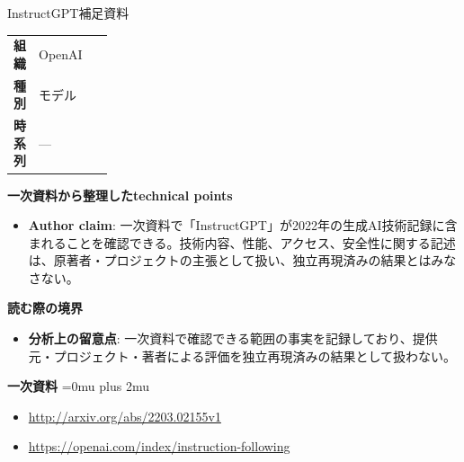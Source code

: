 \begin{technicalnote}{InstructGPT}{補足資料}
\begingroup
\begin{tabularx}{\linewidth}{@{}>{\bfseries}p{0.22\linewidth}X@{}}
組織 & OpenAI \\
種別 & モデル \\
時系列 & — \\
\end{tabularx}
\smallskip
{\bfseries 一次資料から整理したtechnical points}
\begin{itemize}[leftmargin=1.5em,itemsep=0.35em]
\item \textbf{Author claim}: 一次資料で「InstructGPT」が2022年の生成AI技術記録に含まれることを確認できる。技術内容、性能、アクセス、安全性に関する記述は、原著者・プロジェクトの主張として扱い、独立再現済みの結果とはみなさない。
\end{itemize}
\begin{minipage}{\linewidth}
{\bfseries 読む際の境界}
\begin{itemize}[leftmargin=1.5em,itemsep=0.35em]
\item \textbf{分析上の留意点}: 一次資料で確認できる範囲の事実を記録しており、提供元・プロジェクト・著者による評価を独立再現済みの結果として扱わない。
\end{itemize}
\begin{samepage}
{\bfseries 一次資料}
\begingroup\sloppy
\Urlmuskip=0mu plus 2mu\relax
\begin{itemize}[leftmargin=1.5em,itemsep=0.25em]
\item {\scriptsize\url{http://arxiv.org/abs/2203.02155v1}}
\item {\scriptsize\url{https://openai.com/index/instruction-following}}
\end{itemize}
\endgroup
\end{samepage}
\end{minipage}
\endgroup
\end{technicalnote}
\medskip

